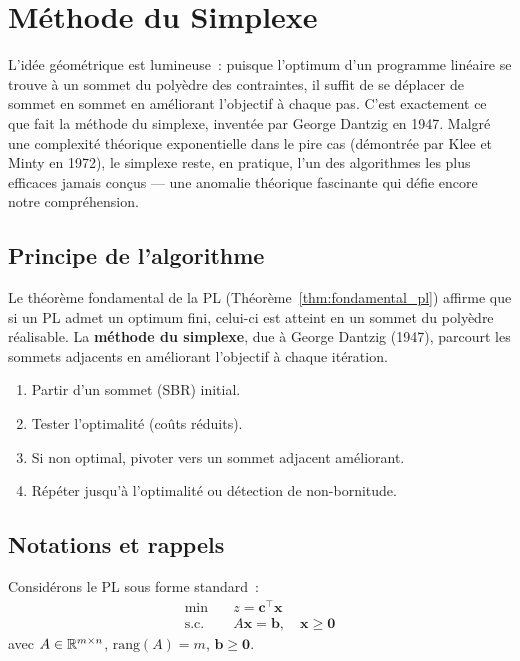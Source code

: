 \chapter{M\'ethode du Simplexe}
\label{ch:simplexe}

L'id\'ee g\'eom\'etrique est lumineuse~: puisque l'optimum d'un programme lin\'eaire se trouve \`a un sommet du poly\`edre des contraintes, il suffit de se d\'eplacer de sommet en sommet en am\'eliorant l'objectif \`a chaque pas. C'est exactement ce que fait la m\'ethode du simplexe, invent\'ee par George Dantzig en 1947. Malgr\'e une complexit\'e th\'eorique exponentielle dans le pire cas (d\'emontr\'ee par Klee et Minty en 1972), le simplexe reste, en pratique, l'un des algorithmes les plus efficaces jamais con\c{c}us --- une anomalie th\'eorique fascinante qui d\'efie encore notre compr\'ehension.

\section{Principe de l'algorithme}

Le th\'eor\`eme fondamental de la PL (Th\'eor\`eme~\ref{thm:fondamental_pl})
affirme que si un PL admet un optimum fini, celui-ci est atteint en un
sommet du poly\`edre r\'ealisable.  La \textbf{m\'ethode du simplexe}, due \`a
George Dantzig (1947), parcourt les sommets adjacents en am\'eliorant
l'objectif \`a chaque it\'eration.

\begin{algorithme}[title=\textbf{Id\'ee g\'en\'erale du simplexe}]
\begin{enumerate}
  \item Partir d'un sommet (SBR) initial.
  \item Tester l'optimalit\'e (co\^uts r\'eduits).
  \item Si non optimal, pivoter vers un sommet adjacent am\'eliorant.
  \item R\'ep\'eter jusqu'\`a l'optimalit\'e ou d\'etection de non-bornitude.
\end{enumerate}
\end{algorithme}

\section{Notations et rappels}

Consid\'erons le PL sous forme standard~:
\[
\begin{aligned}
  \min \quad & z = \mathbf{c}^\top \mathbf{x} \\
  \text{s.c.} \quad & A\mathbf{x} = \mathbf{b}, \quad \mathbf{x} \ge \mathbf{0}
\end{aligned}
\]
avec $A \in \mathbb{R}^{m \times n}$, $\text{rang}(A) = m$, $\mathbf{b} \ge \mathbf{0}$.

